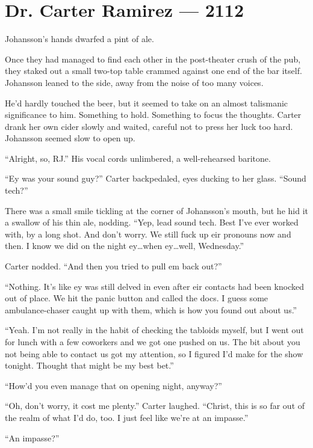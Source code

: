 \hypertarget{dr-carter-ramirez-2112}{%
\chapter*{Dr. Carter Ramirez — 2112}\label{dr-carter-ramirez-2112}}

Johansson's hands dwarfed a pint of ale.

Once they had managed to find each other in the post-theater crush of the pub, they staked out a small two-top table crammed against one end of the bar itself. Johansson leaned to the side, away from the noise of too many voices.

He'd hardly touched the beer, but it seemed to take on an almost talismanic significance to him. Something to hold. Something to focus the thoughts. Carter drank her own cider slowly and waited, careful not to press her luck too hard. Johansson seemed slow to open up.

``Alright, so, RJ.'' His vocal cords unlimbered, a well-rehearsed baritone.

``Ey was your sound guy?'' Carter backpedaled, eyes ducking to her glass. ``Sound tech?''

There was a small smile tickling at the corner of Johansson's mouth, but he hid it a swallow of his thin ale, nodding. ``Yep, lead sound tech. Best I've ever worked with, by a long shot. And don't worry. We still fuck up eir pronouns now and then. I know we did on the night ey\ldots{}when ey\ldots{}well, Wednesday.''

Carter nodded. ``And then you tried to pull em back out?''

``Nothing. It's like ey was still delved in even after eir contacts had been knocked out of place. We hit the panic button and called the docs. I guess some ambulance-chaser caught up with them, which is how you found out about us.''

``Yeah. I'm not really in the habit of checking the tabloids myself, but I went out for lunch with a few coworkers and we got one pushed on us. The bit about you not being able to contact us got my attention, so I figured I'd make for the show tonight. Thought that might be my best bet.''

``How'd you even manage that on opening night, anyway?''

``Oh, don't worry, it cost me plenty.'' Carter laughed. ``Christ, this is so far out of the realm of what I'd do, too. I just feel like we're at an impasse.''

``An impasse?''

